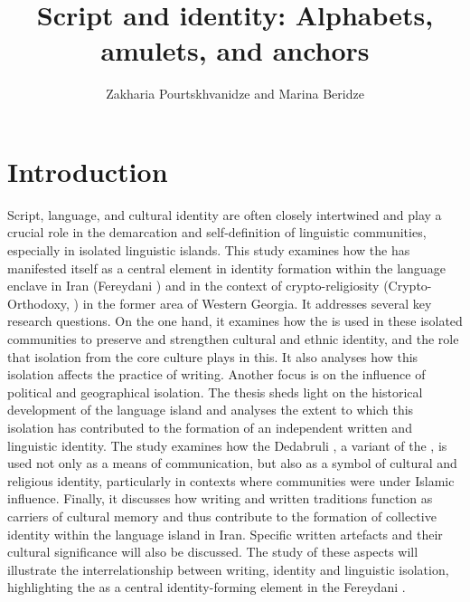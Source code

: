 \documentclass[output=paper,colorlinks,citecolor=brown,arabicfont,georgian]{langscibook}
\author{Zakharia Pourtskhvanidze\orcid{}\affiliation{Goethe-University Frankfurt am Main} and Marina Beridze\orcid{}\affiliation{Javakhishvili State University, Georgia}}
\title{Script and identity: Alphabets, amulets, and anchors}
\begin{document}
\maketitle

\section{Introduction}\label{3.8.ss.1}

Script, language, and cultural identity are often closely intertwined and play a crucial role in the demarcation and self-definition of linguistic communities, especially in isolated linguistic islands. This study examines how the   has manifested itself as a central element in identity formation within the  language enclave in Iran (Fereydani ) and in the context of crypto-religiosity (Crypto-Orthodoxy, \citealt{pourtskhvanidze_beridze_bakuradze2023}) in the former  area of Western Georgia. It addresses several key research questions. On the one hand, it examines how the   is used in these isolated communities to preserve and strengthen cultural and ethnic identity, and the role that isolation from the core  culture plays in this. It also analyses how this isolation affects the practice of writing. Another focus is on the influence of political and geographical isolation. The thesis sheds light on the historical development of the  language island and analyses the extent to which this isolation has contributed to the formation of an independent written and linguistic identity. The study examines how the Dedabruli , a variant of the  , is used not only as a means of communication, but also as a symbol of cultural and religious identity, particularly in contexts where  communities were under Islamic influence. Finally, it discusses how writing and written traditions function as carriers of cultural memory and thus contribute to the formation of collective identity within the  language island in Iran. Specific written artefacts and their cultural significance will also be discussed. The study of these aspects will illustrate the interrelationship between writing, identity and linguistic isolation, highlighting the   as a central identity-forming element in the Fereydani .
\end{document}
